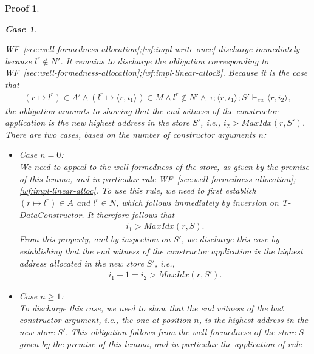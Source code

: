 \documentclass[showabstract,showacknowledgments,showpreface,showdedication,school]{iuphd}
\newtheorem*{bcase}{Case}
\theoremstyle{nonumberplain}
\newtheorem{nproof}{Proof}
\newcommand{\keywd}[1]{\mathit{#1}}
\newcommand{\skeywd}[1]{\mathit{#1}}
\newcommand{\TYP}{\keywd{\tau}}
\newcommand{\loc}{\skeywd{l}}
\newcommand{\concreteloc}[3]{\ensuremath{\langle #1, #2 \rangle ^{#3}}}
\newcommand{\reg}{\skeywd{r}}
\newcommand{\ind}{\keywd{i}}
\newcommand{\STOR}{\keywd{S}}
\newcommand{\MENV}{\keywd{M}}
\newcommand{\AENV}{\keywd{A}}
\newcommand{\NENV}{\keywd{N}}
\newcommand{\locreg}[2]{\ensuremath{{#1}^{#2}}}
\newcommand{\allocptr}[2]{\keywd{MaxIdx}(#1,#2)}
\newcommand{\ewitness}[4]{\ensuremath{#1;#2;#3 \vdash_{ew} #4}}
\newcommand{\refwellformed}[2]{WF~\ref{#1};\ref{#2}}
\newcommand{\tdatacon}{T-DataConstructor}
\begin{document}
\begin{nproof}
\begin{bcase}
\begin{itemize}
\begin{itemize}
      \refwellformed{sec:well-formedness-allocation}{wf:impl-write-once} discharge immediately
      because $\locreg{\loc}{\reg} \not \in \NENV'$.
      It remains to discharge the obligation corresponding to
      \refwellformed{sec:well-formedness-allocation}{wf:impl-linear-alloc2}.
      Because it is the case that
      \begin{align*}
      (\reg \mapsto \locreg{\loc}{\reg}) \in \AENV' \wedge
      (\locreg{\loc}{\reg} \mapsto \concreteloc{\reg}{\ind_1}{}) \in \MENV \wedge \locreg{\loc}{\reg} \not \in \NENV' \wedge
    \, \ewitness{\TYP}{\concreteloc{\reg}{\ind_1}{}}{\STOR'}{\concreteloc{\reg}{\ind_2}{}},
    \end{align*}
    the obligation amounts to showing that the end witness of the
    constructor application is the new highest address in the store
    $\STOR'$, i.e., $\ind_2 > \allocptr{\reg}{\STOR'}$.
    There are two cases, based on the number of constructor arguments $n$:
      \begin{itemize}
      \item Case $n = 0$:\\
      We need to appeal to the well formedness of the store, as given by the premise of this lemma,
      and in particular rule \refwellformed{sec:well-formedness-allocation}{wf:impl-linear-alloc}.
      To use  this rule, we need to first establish
      $(\reg \mapsto \locreg{\loc}{\reg}) \in A$ and $\locreg{\loc}{\reg} \in \NENV$,
      which follows immediately by inversion on \tdatacon{}.
      It therefore follows that
      \begin{align*}
\ind_1 > \allocptr{\reg}{\STOR}.
      \end{align*}
      From this property, and by inspection on $\STOR'$, we discharge
      this case by establishing that the end witness of the constructor
      application is the highest address allocated in the new store $\STOR'$, i.e.,
      \begin{align*}
      \ind_1+1 = \ind_2 > \allocptr{\reg}{\STOR'}.
      \end{align*}
      \item Case $n \geq 1$:\\
      To discharge this case, we need to show that the end witness of the
      last constructor argument, i.e., the one at position $n$,
      is the highest address in the new store $\STOR'$.
      This obligation follows from the well formedness of the
      store $\STOR$ given by the premise of this lemma, and
      in particular the application of rule

\end{itemize}
\end{itemize}
\end{itemize}
\end{bcase}
\end{nproof}
\end{document}
